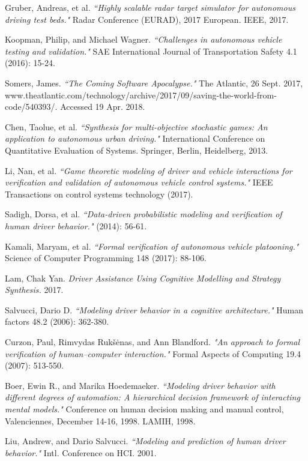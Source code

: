 \documentclass[a4paper]{article}
\begin{document}
\begin{thebibliography}{9}
Gruber, Andreas, et al. \textit{``Highly scalable radar target simulator for autonomous driving test beds."} Radar Conference (EURAD), 2017 European. IEEE, 2017.

Koopman, Philip, and Michael Wagner. \textit{``Challenges in autonomous vehicle testing and validation."} SAE International Journal of Transportation Safety 4.1 (2016): 15-24.

Somers, James. \textit{``The Coming Software Apocalypse."} The Atlantic, 26 Sept. 2017, www.theatlantic.com/technology/archive/2017/09/saving-the-world-from-code/540393/. Accessed 19 Apr. 2018.

Chen, Taolue, et al. \textit{``Synthesis for multi-objective stochastic games: An application to autonomous urban driving."} International Conference on Quantitative Evaluation of Systems. Springer, Berlin, Heidelberg, 2013.

Li, Nan, et al. \textit{``Game theoretic modeling of driver and vehicle interactions for verification and validation of autonomous vehicle control systems."} IEEE Transactions on control systems technology (2017).

Sadigh, Dorsa, et al. \textit{``Data-driven probabilistic modeling and verification of human driver behavior."} (2014): 56-61.

Kamali, Maryam, et al. \textit{``Formal verification of autonomous vehicle platooning."} Science of Computer Programming 148 (2017): 88-106.

Lam, Chak Yan. \textit{Driver Assistance Using Cognitive Modelling and Strategy Synthesis.} 2017.

Salvucci, Dario D. \textit{``Modeling driver behavior in a cognitive architecture."} Human factors 48.2 (2006): 362-380.

Curzon, Paul, Rimvydas Rukšėnas, and Ann Blandford. \textit{"An approach to formal verification of human–computer interaction."} Formal Aspects of Computing 19.4 (2007): 513-550.

Boer, Ewin R., and Marika Hoedemaeker. \textit{``Modeling driver behavior with different degrees of automation: A hierarchical decision framework of interacting mental models."} Conference on human decision making and manual control, Valenciennes, December 14-16, 1998. LAMIH, 1998.

Liu, Andrew, and Dario Salvucci. \textit{``Modeling and prediction of human driver behavior."} Intl. Conference on HCI. 2001.


\end{thebibliography}
\end{document}
